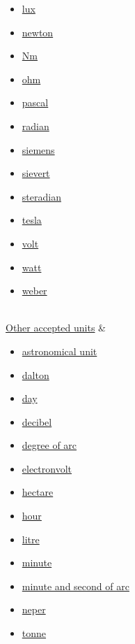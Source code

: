 \documentclass[
]{article}
\providecommand{\tightlist}{%
  \setlength{\itemsep}{0pt}\setlength{\parskip}{0pt}}
\newenvironment{LTR}{\beginL}{\endL}
\begin{document}
\begin{LTR}
\begin{otherlanguage}{english}
\begin{longtable}[]
\begin{minipage}[t]{\linewidth}
\begin{itemize}
  \href{/wiki/Lumen_(unit)}{lumen}
\item
  \href{/wiki/Lux}{lux}
\item
  \href{/wiki/Newton_(unit)}{newton}
\item
  \href{/wiki/Newton-metre}{Nm}
\item
  \href{/wiki/Ohm}{ohm}
\item
  \href{/wiki/Pascal_(unit)}{pascal}
\item
  \href{/wiki/Radian}{radian}
\item
  \href{/wiki/Siemens_(unit)}{siemens}
\item
  \href{/wiki/Sievert}{sievert}
\item
  \href{/wiki/Steradian}{steradian}
\item
  \href{/wiki/Tesla_(unit)}{tesla}
\item
  \href{/wiki/Volt}{volt}
\item
  \href{/wiki/Watt}{watt}
\item
  \href{/wiki/Weber_(unit)}{weber}
\end{itemize}
\end{minipage} \\
\href{/wiki/Non-SI_units_mentioned_in_the_SI}{Other accepted units} &
\begin{minipage}[t]{\linewidth}\raggedright
\begin{itemize}
\tightlist
\item
  \href{/wiki/Astronomical_unit}{astronomical unit}
\item
  \href{/wiki/Dalton_(unit)}{dalton}
\item
  \href{/wiki/Day}{day}
\item
  \href{/wiki/Decibel}{decibel}
\item
  \href{/wiki/Degree_(angle)}{degree of arc}
\item
  \href{/wiki/Electronvolt}{electronvolt}
\item
  \href{/wiki/Hectare}{hectare}
\item
  \href{/wiki/Hour}{hour}
\item
  \href{/wiki/Litre}{litre}
\item
  \href{/wiki/Minute}{minute}
\item
  \href{/wiki/Minute_and_second_of_arc}{minute and second of arc}
\item
  \href{/wiki/Neper}{neper}
\item
  \href{/wiki/Tonne}{tonne}
\end{itemize}
\end{minipage} \\

\end{longtable}
\end{otherlanguage}
\end{LTR}
\end{document}
